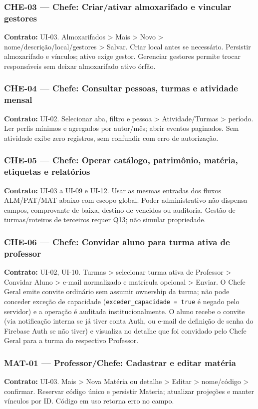 \subsubsection{CHE-03 --- Chefe: Criar/ativar almoxarifado e vincular gestores}
\textbf{Contrato:} UI-03. Almoxarifados > Mais > Novo > nome/descrição/local/gestores > Salvar. Criar local antes se necessário. Persistir almoxarifado e vínculos; ativo exige gestor. Gerenciar gestores permite trocar responsáveis sem deixar almoxarifado ativo órfão.

\subsubsection{CHE-04 --- Chefe: Consultar pessoas, turmas e atividade mensal}
\textbf{Contrato:} UI-02. Selecionar aba, filtro e pessoa > Atividade/Turmas > período. Ler perfis mínimos e agregados por autor/mês; abrir eventos paginados. Sem atividade exibe zero registros, sem confundir com erro de autorização.

\subsubsection{CHE-05 --- Chefe: Operar catálogo, patrimônio, matéria, etiquetas e relatórios}
\textbf{Contrato:} UI-03 a UI-09 e UI-12. Usar as mesmas entradas dos fluxos ALM/PAT/MAT abaixo com escopo global. Poder administrativo não dispensa campos, comprovante de baixa, destino de vencidos ou auditoria. Gestão de turmas/roteiros de terceiros requer Q13; não simular propriedade.

\subsubsection{CHE-06 --- Chefe: Convidar aluno para turma ativa de professor}
\textbf{Contrato:} UI-02, UI-10. Turmas > selecionar turma ativa de Professor > Convidar Aluno > e-mail normalizado e matrícula opcional > Enviar. O Chefe Geral emite convite ordinário sem assumir ownership da turma; não pode conceder exceção de capacidade (\texttt{exceder\_capacidade = true} é negado pelo servidor) e a operação é auditada institucionalmente. O aluno recebe o convite (via notificação interna se já tiver conta Auth, ou e-mail de definição de senha do Firebase Auth se não tiver) e visualiza no detalhe que foi convidado pelo Chefe Geral para a turma do respectivo Professor.

\subsubsection{MAT-01 --- Professor/Chefe: Cadastrar e editar matéria}
\textbf{Contrato:} UI-03. Mais > Nova Matéria ou detalhe > Editar > nome/código > confirmar. Reservar código único e persistir Materia; atualizar projeções e manter vínculos por ID. Código em uso retorna erro no campo.


